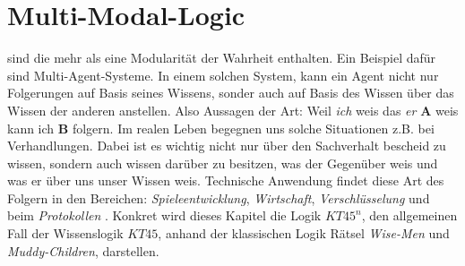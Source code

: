 

\chapter{Multi-Modal-Logic} %
\label{sec:multi_modal_logic}
\MML sind \NML die mehr als eine Modularität der Wahrheit enthalten.
Ein Beispiel dafür sind Multi-Agent-Systeme. 
In einem solchen System, kann ein Agent nicht nur Folgerungen auf Basis seines Wissens, sonder auch auf Basis des Wissen über das Wissen der anderen anstellen. 
Also Aussagen der Art: Weil \emph{ich} weis das \emph{er} \textbf{A} weis kann ich \textbf{B} folgern.
Im realen Leben begegnen uns solche Situationen z.B. bei Verhandlungen.
Dabei ist es wichtig nicht nur über den Sachverhalt bescheid zu wissen, sondern auch wissen darüber zu besitzen, was der Gegenüber weis und was er über uns unser Wissen weis.
Technische Anwendung findet diese Art des Folgern in den Bereichen: \emph{Spieleentwicklung}, \emph{Wirtschaft}, \emph{Verschlüsselung} und beim \emph{Protokollen} .
Konkret wird dieses Kapitel die Logik $KT45^n$, den allgemeinen Fall der Wissenslogik $KT45$, anhand der klassischen Logik Rätsel \emph{Wise-Men} und \emph{Muddy-Children}, darstellen.





